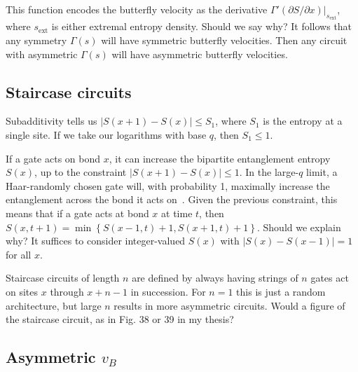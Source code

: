 \documentclass[aps,prx,reprint,superscriptaddress, longbibliography]{revtex4-1}
\newcommand{\charlie}[1]{ {\color{Magenta} {{#1}}}}
\begin{document}
This function encodes the butterfly velocity as the derivative $\Gamma'(\partial S / \partial x)|_{s_\text{ext}}$, where $s_\text{ext}$ is either extremal entropy density. \charlie{Should we say why?} It follows that any symmetry $\Gamma(s)$ will have symmetric butterfly velocities. Then any circuit with asymmetric $\Gamma(s)$ will have asymmetric butterfly velocities.

\subsection{Staircase circuits}

Subadditivity tells us $|S(x + 1) - S(x)| \le S_1$, where $S_1$ is the entropy at a single site. If we take our logarithms with base $q$, then $S_1 \le 1$.

If a gate acts on bond $x$, it can increase the bipartite entanglement entropy $S(x)$, up to the constraint $|S(x + 1) - S(x)| \le 1$. In the large-$q$ limit, a Haar-randomly chosen gate will, with probability 1, maximally increase the entanglement across the bond it acts on~\cite{nahum2017quantum}. Given the previous constraint, this means that if a gate acts at bond $x$ at time $t$, then $S(x, t+1) = \min\left\lbrace S(x-1,t)+1, S(x+1,t)+1\right\rbrace$. \charlie{Should we explain why?} It suffices to consider integer-valued $S(x)$ with $|S(x)-S(x-1)|=1$ for all $x$. 

Staircase circuits of length $n$ are defined by always having strings of $n$ gates act on sites $x$ through $x+n-1$ in succession. For $n=1$ this is just a random architecture, but large $n$ results in more asymmetric circuits. \charlie{Would a figure of the staircase circuit, as in Fig. 38 or 39 in my thesis?}

\subsection{Asymmetric $v_B$}
\end{document}
